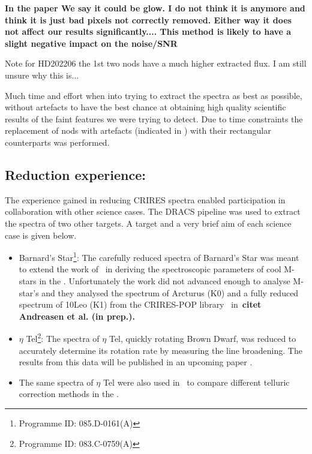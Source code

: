 

\textbf{In the paper We say it could be glow. I do not think it is anymore and think it is just bad pixels not correctly removed. Either way it does not affect our results significantly....
This method is likely to have a slight negative impact on the noise/SNR}

Note for HD202206 the 1st two nods have a much higher extracted flux. I am still unsure why this is...


Much time and effort when into trying to extract the spectra as best as possible, without artefacts to have the best chance at obtaining high quality scientific results of the faint features we were trying to detect.
Due to time constraints the replacement of nods with artefacts (indicated in ) with their rectangular counterparts was performed.

\subsection{Reduction experience:}
\label{subsec:experience}
The experience gained in reducing CRIRES spectra enabled participation in collaboration with other science cases. The DRACS pipeline was used to extract the spectra of two other targets. A target and a very brief aim of each science case is given below.
\begin{itemize}
\item Barnard's Star\footnote{Programme ID: 085.D-0161(A)}: The carefully reduced \nir{} spectra of Barnard's Star was meant to extend the work of~\citet{andreasen_nearinfrared_2016} in deriving the spectroscopic parameters of cool M-stars in the \nir. Unfortunately the work did not advanced enough to analyse M-star's and they analysed the spectrum of {Arcturus} (K0)  and a fully reduced spectrum of {10Leo} (K1) from the CRIRES-POP library~\cite{nicholls_crirespop_2017} in~\bf{citet {Andreasen et al. (in prep.)}}.
\item \(\eta\) Tel\footnote{Programme ID: 083.C-0759(A)}: The spectra of {\(\eta\) Tel}, quickly rotating Brown Dwarf, was reduced to accurately determine its rotation rate by measuring the line broadening. The results from this data will be published in an upcoming paper .
\item The same spectra of \(\eta\) Tel were also used in~\citet{ulmer-moll_telluric_2018} to compare different telluric correction methods in the \nir.
\end{itemize}

